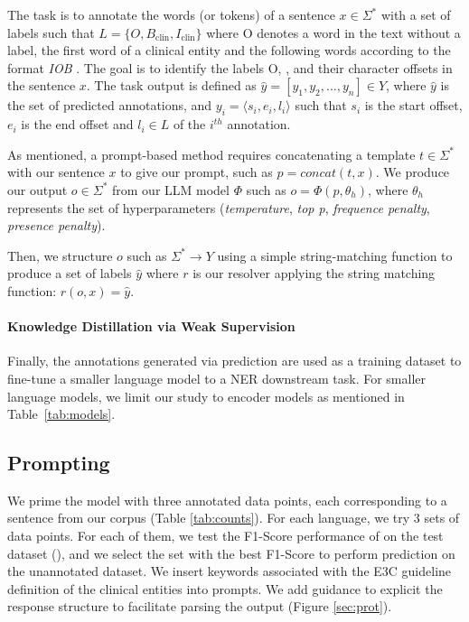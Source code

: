  The task is to annotate the words (or tokens) of a sentence $x \in \Sigma^*$ with a set of labels such that $L=\{O, B_\text{clin}, I_{\text{clin}}\}$ where O denotes a word in the text without a label, \bclin the first word of a clinical entity and \iclin the following words according to the format \textit{IOB} \citep{Ramshaw1995TextLearning}. The goal is to identify the labels O, \bclin, \iclin and their character offsets in the sentence $x$. The task output is defined as $\hat{y}=[ y_1, y_2, \ldots, y_n ] \in Y$, where $\hat{y}$ is the set of predicted annotations, and $y_i= \langle s_i, e_i, l_i
\rangle$ such that $s_i$ is the start offset, $e_i$ is the end offset and $l_i\in L$ of the $i^{th}$ annotation.


As mentioned, a prompt-based method requires concatenating a template $t \in \Sigma^*$ with our sentence $x$ to give our prompt, such as $p=concat(t,x)$. 
We produce our output $o \in \Sigma^*$ from our LLM model $\Phi$ such as $o=\Phi(p, \theta_h)$, where $\theta_h$ represents the set of hyperparameters (\textit{temperature}, \textit{top p}, \textit{frequence penalty}, \textit{presence penalty}).

Then, we structure $o$ such as $\Sigma^* \rightarrow Y$ using a simple string-matching function to produce a set of labels $\hat{y}$ where $r$ is our resolver applying the string matching function: $r(o, x)=\hat{y}$.

\paragraph{Knowledge Distillation via Weak Supervision} Finally, the annotations generated via \instruct prediction are used as a training dataset to fine-tune a smaller language model to a NER downstream task. For smaller language models, we limit our study to encoder models as mentioned in Table~\ref{tab:models}.

\subsection{Prompting}

We prime the model with three annotated data points, each corresponding to a sentence from our corpus (Table \ref{tab:counts}).
For each language, we try 3 sets of data points. For each of them, we test the F1-Score performance of \instruct on the test dataset (\layerOne), and we select the set with the best F1-Score to perform prediction on the unannotated dataset. 
 We insert keywords associated with the E3C guideline definition of the clinical entities into prompts. 
 We add guidance to explicit the response structure to facilitate parsing the output \citep{Agrawal2022LargeExtractors} (Figure \ref{sec:prot}).

